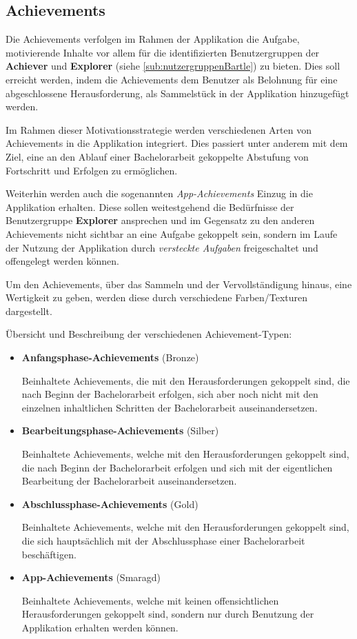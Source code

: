 \documentclass[bibliography=totoc,listof=totoc,BCOR=5mm,DIV=12,oneside]{scrbook}
\begin{document}
\subsection{Achievements} \label{sub:konzeptGamificationAchievements}
\par Die Achievements verfolgen im Rahmen der Applikation die Aufgabe, motivierende Inhalte vor allem für die identifizierten Benutzergruppen der \textbf{Achiever} und \textbf{Explorer} (siehe \ref{sub:nutzergruppenBartle}) zu bieten. Dies soll erreicht werden, indem die Achievements dem Benutzer als Belohnung für eine abgeschlossene Herausforderung, als Sammelstück in der Applikation hinzugefügt werden.
\par \medskip Im Rahmen dieser Motivationsstrategie werden verschiedenen Arten von Achievements in die Applikation integriert. Dies passiert unter anderem mit dem Ziel, eine an den Ablauf einer Bachelorarbeit gekoppelte Abstufung von Fortschritt und Erfolgen zu ermöglichen. 
\par Weiterhin werden auch die sogenannten \textit{App-Achievements} Einzug in die Applikation erhalten. Diese sollen weitestgehend die Bedürfnisse der Benutzergruppe \textbf{Explorer} ansprechen und im Gegensatz zu den anderen Achievements nicht sichtbar an eine Aufgabe gekoppelt sein, sondern im Laufe der Nutzung der Applikation durch \textit{versteckte Aufgaben} freigeschaltet und offengelegt werden können.

\par \medskip Um den Achievements, über das Sammeln und der Vervollständigung hinaus, eine Wertigkeit zu geben, werden diese durch verschiedene Farben/Texturen dargestellt. 

\par \bigskip Übersicht und Beschreibung der verschiedenen Achievement-Typen:
\begin{itemize}
\item \textbf{Anfangsphase-Achievements} (Bronze)
\par Beinhaltete Achievements, die mit den Herausforderungen gekoppelt sind, die nach Beginn der Bachelorarbeit erfolgen, sich aber noch nicht mit den einzelnen inhaltlichen Schritten der Bachelorarbeit auseinandersetzen.
\item \textbf{Bearbeitungsphase-Achievements} (Silber)
\par Beinhaltete Achievements, welche mit den Herausforderungen gekoppelt sind, die nach Beginn der Bachelorarbeit erfolgen und sich mit der eigentlichen Bearbeitung der Bachelorarbeit auseinandersetzen.
\item \textbf{Abschlussphase-Achievements} (Gold)
\par Beinhaltete Achievements, welche mit den Herausforderungen gekoppelt sind, die sich hauptsächlich mit der Abschlussphase einer Bachelorarbeit beschäftigen.
\item \textbf{App-Achievements} (Smaragd)
\par Beinhaltete Achievements, welche mit keinen offensichtlichen Herausforderungen gekoppelt sind, sondern nur durch Benutzung der Applikation erhalten werden können.
\end{itemize} 
\end{document}
